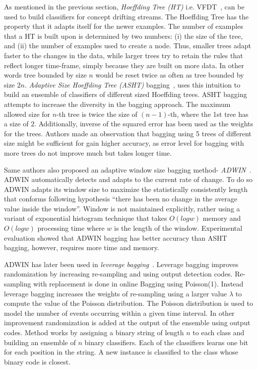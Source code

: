 As mentioned in the previous section, \textit{Hoeffding Tree (HT)} i.e. VFDT~\cite{domingos00:vfdt}, can be used to build classifiers for concept drifting streams. The Hoeffding Tree has the property that it adapts itself for the newer examples. The number of examples that a HT is built upon is determined by two numbers: (i) the  size of the tree, and (ii) the number of examples used to create a node. Thus, smaller trees adapt faster to the changes in the data, while larger trees try to retain the rules that reflect longer time-frame, simply because they are built on more data. In other words tree bounded by size $n$ would be reset twice as often as tree bounded by size $2n$. \textit{Adaptive Size Hoeffding Tree (ASHT)} bagging~\cite{bifet09:asht}, uses this intuition to build an ensemble of classifiers of different sized Hoeffding trees. ASHT bagging attempts to increase the diversity in the bagging approach. The maximum allowed size for $n$-th tree is twice the size of $(n-1)$-th, where the 1st tree has a size of $2$. Additionally, inverse of the squared error has been used as the weights for the trees. Authors made an observation that bagging using 5 trees of different size might be sufficient for gain higher accuracy, as error level for bagging with more trees do not improve much but takes longer time.

Same authors also proposed an adaptive window size bagging method- \textit{ADWIN}~\cite{bifet09:asht}. ADWIN automatically detects and adapts to the current rate of change. To do so ADWIN adapts its window size to maximize the statistically consistently length that conforms following hypothesis ``there has been no change in the average value inside the window''. Window is not maintained explicitly, rather using a variant of exponential histogram technique that takes $O(log w)$ memory and $O(log w)$ processing time where $w$ is the length of the window. Experimental evaluation showed that ADWIN bagging has better accuracy than ASHT bagging, however, requires more time and memory. 

ADWIN has later been used in \textit{leverage bagging}~\cite{bifet10:levbag}. Leverage bagging improves randomization by increasing re-sampling and using output detection codes. Re-sampling with replacement is done in online Bagging using Poisson(1). Instead leverage bagging increases the weights of re-sampling using a larger value $\lambda$ to compute the value of the Poisson distribution. The Poisson distribution is used to model the number of events occurring within a given time interval. In other improvement randomization is added at the output of the ensemble using output codes. Method works by assigning a binary string of length $n$ to each class and building an ensemble of $n$ binary classifiers. Each of the classifiers learns one bit for each position in the string. A new instance is classified to the class whose binary code is closest. 

